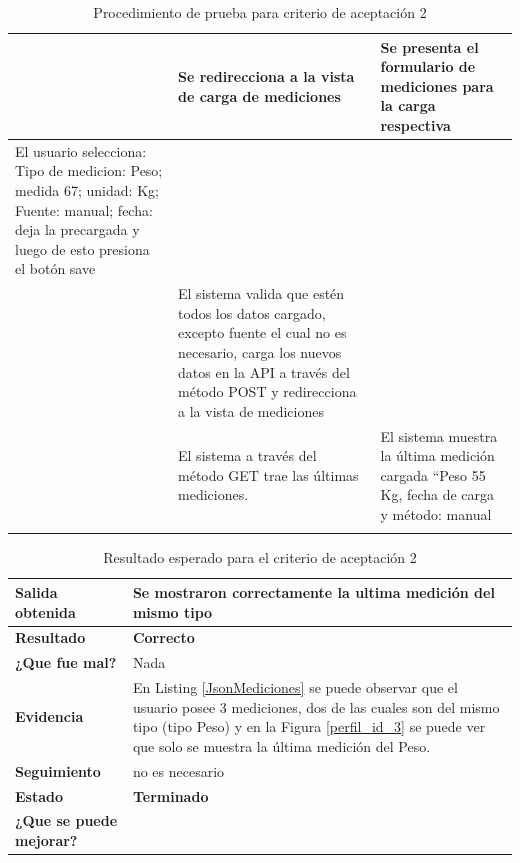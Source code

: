 \documentclass[a4paper,12pt]{article}
\begin{document}
\begin{longtable}{|p{5cm}|p{5cm}|p{4cm}|}
        & Se redirecciona a la vista de carga de mediciones&Se presenta el formulario de mediciones para la carga respectiva\\ \hline
        El usuario selecciona: Tipo de medicion: Peso; medida 67; unidad: Kg; Fuente: manual; fecha: deja la precargada y  luego de esto presiona el botón save& &\\ \hline       
        & El sistema valida que estén todos los datos cargado, excepto fuente el cual no es necesario, carga los nuevos datos en la API a través del método POST y redirecciona a la vista de mediciones&\\ \hline       
        &El sistema a través del método GET trae las últimas mediciones. &El sistema muestra la última medición cargada ``Peso 55 Kg, fecha de carga y método: manual\\ \hline
        \caption{Procedimiento de prueba para criterio de aceptación 2}
        
	    \end{longtable}
        
\clearpage

{\scriptsize
	\begin{table}[h]
	\centering
	\begin{tabular}{|l|p{10cm}|}
	    \hline 
	    \textbf{Salida obtenida}& Se mostraron correctamente la ultima medición del mismo tipo\\ \hline
	    \textbf{Resultado}& \textbf{Correcto}\\ \hline
        \textbf{¿Que fue mal?}& Nada\\ \hline      
        \textbf{Evidencia}& En Listing \ref{JsonMediciones} se puede observar que el usuario posee 3 mediciones, dos de las cuales son del mismo tipo (tipo Peso) y en la Figura \ref{perfil_id_3} se puede ver que solo se muestra la última medición del Peso.  \\ \hline
        \textbf{Seguimiento}& no es necesario\\ \hline
        \textbf{Estado}& \textbf{Terminado}\\ \hline        
        \textbf{¿Que se puede mejorar?}& \\ \hline              
	    \end{tabular}
        \caption{Resultado esperado para el criterio de aceptación 2}
    	\end{table}
	}
\end{document}

